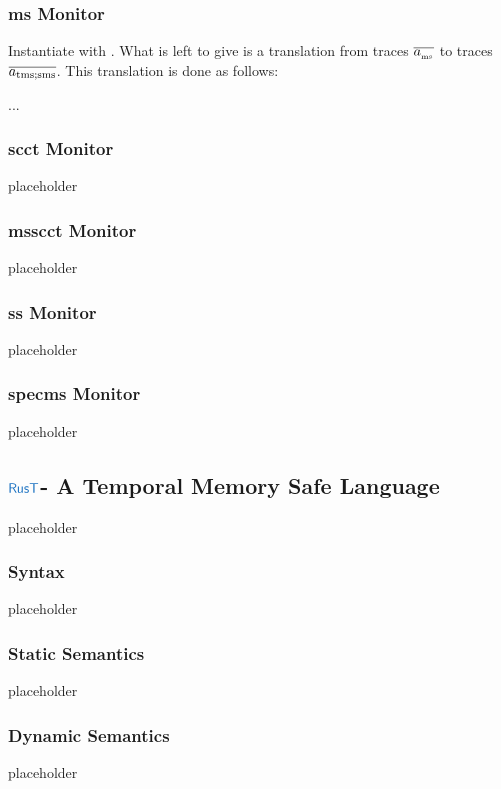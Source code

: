 \documentclass[a4paper,12pt]{article}
\begin{document}
\subsubsection{\gls*{ms} Monitor}\label{subsubsec-mon-ms}
Instantiate  with . 
What is left to give is a translation from traces $\msTrace$ to traces $\varTrace[\tmssafe;\smssafe]$.
This translation is done as follows:
\begin{definition}{}
  ...
\end{definition}

\subsubsection{\gls*{scct} Monitor}\label{subsubsec-mon-scct}
placeholder
\subsubsection{\gls*{msscct} Monitor}\label{subsubsec-mon-msscct}
placeholder
\subsubsection{\gls*{ss} Monitor}\label{subsubsec-mon-spec}
placeholder
\subsubsection{\gls*{specms} Monitor}\label{subsubsec-mon-specms}
placeholder


\subsection{$\src{RusT}$- A Temporal Memory Safe Language}\label{subsec-rust}
placeholder
\subsubsection{Syntax}\label{subsec-rust-syntax}
placeholder
\subsubsection{Static Semantics}\label{subsec-rust-static}
placeholder
\subsubsection{Dynamic Semantics}\label{subsec-rust-dynamic}
placeholder
\end{document}
